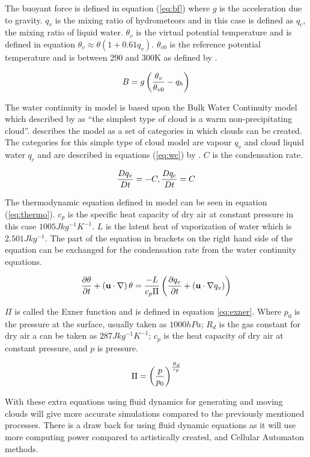 The buoyant force is defined in equation (\ref{eq:bf}) where $g$ is the acceleration due to gravity.
$q_{v}$ is the mixing ratio of hydrometeors and in this case is defined as $q_{c}$, the mixing ratio of liquid water.
$\theta_{v}$ is the virtual potential temperature and is defined in equation $\theta_{v} \approx \theta(1+0.61 q_{v})$.
$\theta_{v0}$ is the reference potential temperature and is between 290 and 300K as defined by \citet{HarrisEtAl03}.

\begin{equation} \label{eq:bf}
  \centering
  B = g\left(\frac{\theta_{v}}{\theta_{v0}} - q_{h}\right)
\end{equation}

The water continuity in \citet{HarrisEtAl03} model is based upon the Bulk Water Continuity model which described by \citet{houze1994cloud} as “the simplest type of cloud is a warm non-precipitating cloud”.
\citet{houze1994cloud} describes the model as a set of categories in which clouds can be created.
The categories for this simple type of cloud model are vapour $q_{v}$ and cloud liquid water $q_{c}$ and are described in equations (\ref{eq:wc}) by \citet{houze1994cloud}.
$C$ is the condensation rate.

\begin{equation} \label{eq:wc}
  \centering
  \frac{Dq_{v}}{Dt} = - C,	\frac{Dq_{c}}{Dt} = C
\end{equation}

The thermodynamic equation defined in \citet{HarrisEtAl03} model can be seen in equation (\ref{eq:thermo}). $c_{p}$ is the specific heat capacity of dry air at constant pressure in this case $1005J kg^{-1} K^{-1}$. $L$ is the latent heat of vaporization of water which is $2.501 J kg^{-1}$.
The part of the equation in brackets on the right hand side of the equation can be exchanged for the condensation rate from the water continuity equations.

\begin{equation} \label{eq:thermo}
  \centering
  \frac{\partial\theta}{\partial t} + \left(\mathbf{u}\cdot\nabla\right)\theta = \frac{-L}{c_{p}\Pi}\left(\frac{\partial q_{v}}{\partial t} + \left(\mathbf{u\cdot\nabla}q_{v}\right)\right)
\end{equation}

$\Pi$ is called the Exner function and is defined in equation \ref{eq:exner}.
Where $p_{0}$ is the pressure at the surface, usually taken as $1000 hPa$; $R_{d}$ is the gas constant for dry air a can be taken as $287 J kg^{-1} K^{-1}$; $c_{p}$ is the heat capacity of dry air at constant pressure, and $p$ is pressure.

\begin{equation} \label{eq:exner}
  \centering
  \Pi = \left(\frac{p}{p_{0}}\right)^{\frac{R_{d}}{c_{p}}}
\end{equation}

With these extra equations using fluid dynamics for generating and moving clouds will give more accurate simulations compared to the previously mentioned processes. There is a draw back for using fluid dynamic equations as it will use more computing power compared to artistically created, and Cellular Automaton methods. 